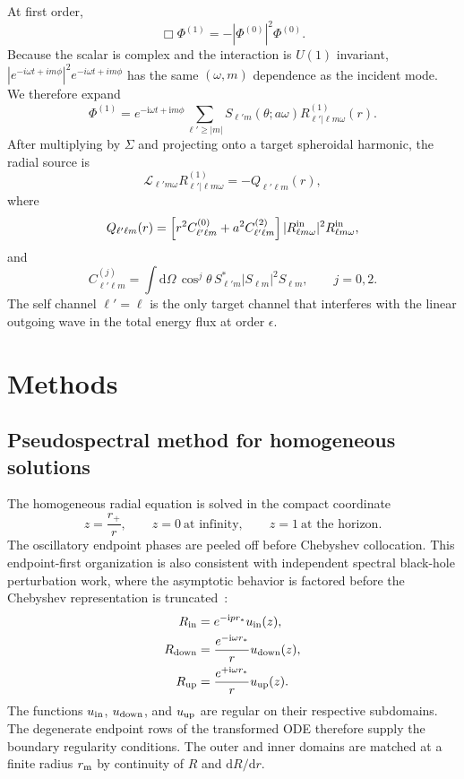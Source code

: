 \documentclass[aps,prd,twocolumn,10pt,nofootinbib,superscriptaddress,floatfix]{revtex4-2}
\newcommand{\dd}{\mathrm{d}}
\newcommand{\ii}{\mathrm{i}}
\newcommand{\rp}{r_+}
\begin{document}
At first order,
\begin{equation}
\Box\Phi^{(1)}=-|\Phi^{(0)}|^2\Phi^{(0)}.
\end{equation}
Because the scalar is complex and the interaction is $U(1)$ invariant,
$|e^{-i\omega t+im\phi}|^2e^{-i\omega t+im\phi}$ has the same
$(\omega,m)$ dependence as the incident mode.  We therefore expand
\begin{equation}
\Phi^{(1)}=e^{-\ii\omega t+\ii m\phi}
\sum_{\ell'\ge |m|}S_{\ell' m}(\theta;a\omega)
R^{(1)}_{\ell'|\ell m\omega}(r).
\end{equation}
After multiplying by $\Sigma$ and projecting onto a target spheroidal harmonic,
the radial source is
\begin{equation}
\mathcal L_{\ell'm\omega}R^{(1)}_{\ell'|\ell m\omega}
=-Q_{\ell'\ell m}(r),
\end{equation}
where
\begin{equation}
Q_{\ell'\ell m}(r)=
\left[r^2C^{(0)}_{\ell'\ell m}+a^2C^{(2)}_{\ell'\ell m}\right]
|R^{\rm in}_{\ell m\omega}|^2R^{\rm in}_{\ell m\omega},
\label{eq:source}
\end{equation}
and
\begin{equation}
C^{(j)}_{\ell'\ell m}
=\int \dd\Omega\,\cos^j\theta\,
S_{\ell'm}^*|S_{\ell m}|^2S_{\ell m},
\qquad j=0,2 .
\end{equation}
The self channel $\ell'=\ell$ is the only target channel that interferes with
the linear outgoing wave in the total energy flux at order $\epsilon$.

\section{Methods}
\label{sec:methods}

\subsection{Pseudospectral method for homogeneous solutions}

The homogeneous radial equation is solved in the compact coordinate
\begin{equation}
z=\frac{\rp}{r},\qquad z=0\ \text{at infinity},\qquad z=1\ \text{at the horizon}.
\end{equation}
The oscillatory endpoint phases are peeled off before Chebyshev collocation.
This endpoint-first organization is also
consistent with independent spectral black-hole perturbation work, where the
asymptotic behavior is factored before the Chebyshev representation is
truncated~\cite{ChungWagleYunes2023}:
\begin{align}
R_{\rm in}&=e^{-\ii p r_*}u_{\rm in}(z),\\
R_{\rm down}&=\frac{e^{-\ii\omega r_*}}{r}u_{\rm down}(z),\\
R_{\rm up}&=\frac{e^{+\ii\omega r_*}}{r}u_{\rm up}(z).
\end{align}
The functions $u_{\rm in}$, $u_{\rm down}$, and $u_{\rm up}$ are regular
on their respective subdomains.  The degenerate endpoint rows of the
transformed ODE therefore supply the boundary regularity conditions.  The
outer and inner domains are matched at a finite radius $r_{\rm m}$ by continuity
of $R$ and $\dd R/\dd r$.
\end{document}
